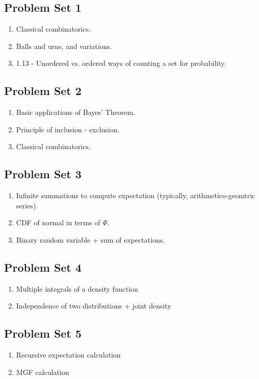 \documentclass{article}
\begin{document}
\subsection{Problem Set 1}
\begin{enumerate}
  \item Classical combinatorics.
  \item Balls and urns, and variations.
  \item 1.13 - Unordered vs. ordered ways of counting a set for probability.
\end{enumerate}
\subsection{Problem Set 2}
\begin{enumerate}
  \item Basic applications of Bayes' Theorem.
  \item Principle of inclusion - exclusion.
  \item Classical combinatorics.
\end{enumerate}
\subsection{Problem Set 3}
\begin{enumerate}
  \item Infinite summations to compute expectation (typically, arithmetico-geomtric series).
  \item CDF of normal in terms of $\Phi$.
  \item Binary random variable + sum of expectations.
\end{enumerate}
\subsection{Problem Set 4}
\begin{enumerate}
  \item Multiple integrals of a density function
  \item Independence of two distributions + joint density
\end{enumerate}
\subsection{Problem Set 5}
\begin{enumerate}
  \item Recursive expectation calculation
  \item MGF calculation
\end{enumerate}
\end{document}

